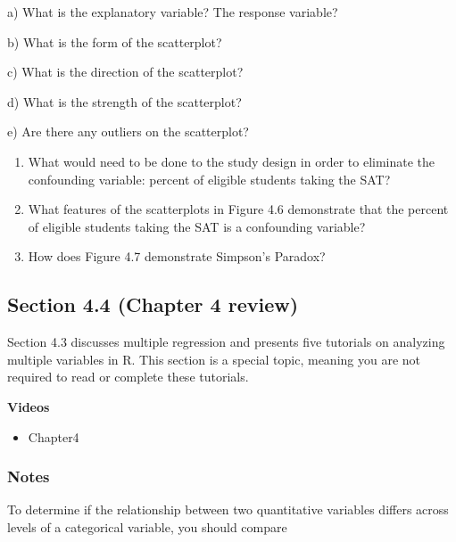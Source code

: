\documentclass[
]{report}
\providecommand{\tightlist}{%
  \setlength{\itemsep}{0pt}\setlength{\parskip}{0pt}}
\newcommand{\rgs}{\vspace{12pt}} %
\newcommand{\rgi}{\hspace{24pt}}  %
\begin{document}
\rgi a) What is the explanatory variable? The response variable?
\rgs

\rgi b) What is the form of the scatterplot?
\rgs

\rgi c) What is the direction of the scatterplot?
\rgs

\rgi d) What is the strength of the scatterplot?
\rgs

\rgi e) Are there any outliers on the scatterplot?
\rgs

\begin{enumerate}
\def\labelenumi{\arabic{enumi}.}
\setcounter{enumi}{2}
\item
  What would need to be done to the study design in order to eliminate the confounding variable: percent of eligible students taking the SAT?
  \rgs
\item
  What features of the scatterplots in Figure 4.6 demonstrate that the percent of eligible students taking the SAT is a confounding variable?
  \rgs
\item
  How does Figure 4.7 demonstrate Simpson's Paradox?
  \rgs
\end{enumerate}

\hypertarget{section-4.4-chapter-4-review}{%
\subsection*{Section 4.4 (Chapter 4 review)}\label{section-4.4-chapter-4-review}}


Section 4.3 discusses multiple regression and presents five tutorials on analyzing multiple variables in R. This section is a special topic, meaning you are not required to read or complete these tutorials.

\textbf{Videos}

\begin{itemize}
\tightlist
\item
  Chapter4
\end{itemize}


\hypertarget{notes-13}{%
\subsubsection*{Notes}\label{notes-13}}

To determine if the relationship between two quantitative variables differs across levels of a categorical variable, you should compare
\rgs
\end{document}
